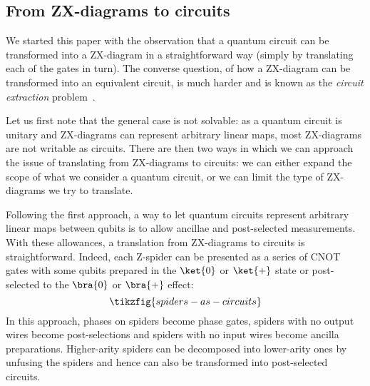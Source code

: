 \documentclass[a4paper,onecolumn,superscriptaddress,11pt,%
				unpublished,%
				allowfontchageintitle,%
				]{quantumarticle}
\begin{document}
\subsection{From ZX-diagrams to circuits}\label{sec:circuit-extraction}

We started this paper with the observation that a quantum circuit can be transformed into a ZX-diagram in a straightforward way (simply by translating each of the gates in turn). The converse question, of how a ZX-diagram can be transformed into an equivalent circuit, is much harder and is known as the \emph{circuit extraction} problem~\cite{cliffsimp}.

Let us first note that the general case is not solvable: as a quantum circuit is unitary and ZX-diagrams can represent arbitrary linear maps, most ZX-diagrams are not
writable as circuits. There are then two ways in which we can approach the issue of translating from ZX-diagrams to circuits: we can either expand the scope of what we consider a quantum circuit, or we can limit the type of ZX-diagrams we try to translate.

Following the first approach, a way to let quantum circuits represent arbitrary linear maps between qubits is to allow ancillae and post-selected measurements. With these allowances, a translation from ZX-diagrams to circuits is straightforward. Indeed, each Z-spider can be presented as a series of CNOT gates with some qubits prepared in the $\ket{0}$ or $\ket{+}$ state or post-selected to the $\bra{0}$ or $\bra{+}$ effect:
\begin{equation}
	\tikzfig{spiders-as-circuits}
\end{equation}
In this approach, phases on spiders become phase gates, spiders with no output wires become post-selections and spiders with no input wires become ancilla preparations. Higher-arity spiders can be decomposed into lower-arity ones by unfusing the spiders and hence can also be transformed into post-selected circuits.
\end{document}
